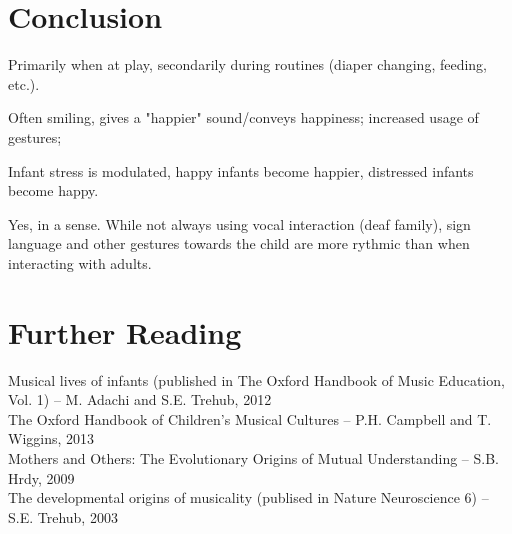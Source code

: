 \documentclass{beamer}
\begin{document}
\section{Conclusion}
\begin{frame}
	\item %
	\item Primarily when at play, secondarily during routines (diaper changing, feeding, etc.).
	\item Often smiling, gives a "happier" sound/conveys happiness; increased usage of gestures; %
	\item Infant stress is modulated, happy infants become happier, distressed infants become happy.
	\item %
	\item %
	\item Yes, in a sense. While not always using vocal interaction (deaf family), sign language and other gestures towards the child are more rythmic than when interacting with adults.
\end{frame}

\section{Further Reading}
\begin{frame}
	Musical lives of infants (published in The Oxford Handbook of Music Education, Vol. 1) -- M. Adachi and S.E. Trehub, 2012\\
	The Oxford Handbook of Children's Musical Cultures -- P.H. Campbell and T. Wiggins, 2013\\
	Mothers and Others: The Evolutionary Origins of Mutual Understanding -- S.B. Hrdy, 2009\\
	The developmental origins of musicality (publised in Nature Neuroscience 6) -- S.E. Trehub, 2003
	
\end{frame}
\end{document}
